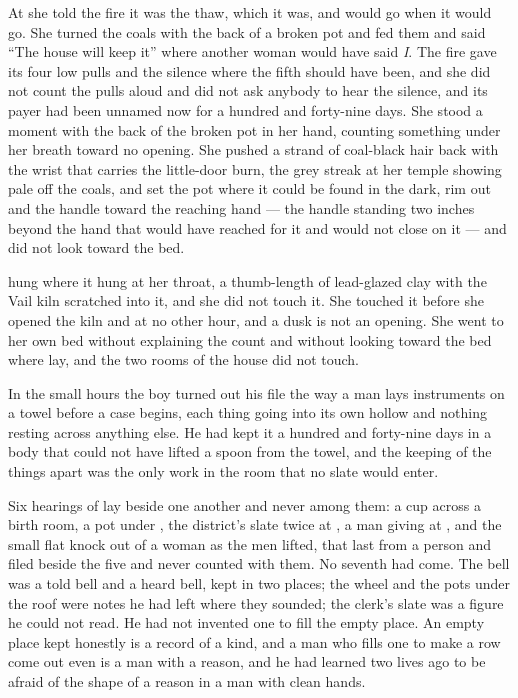 At  she told the fire it was the thaw, which it was, and would go when it would go. She turned the coals with the back of a broken pot and fed them and said “The house will keep it” where another woman would have said \emph{I}. The fire gave its four low pulls and the silence where the fifth should have been, and she did not count the pulls aloud and did not ask anybody to hear the silence, and its payer had been unnamed now for a hundred and forty-nine days. She stood a moment with the back of the broken pot in her hand, counting something under her breath toward no opening. She pushed a strand of coal-black hair back with the wrist that carries the little-door burn, the grey streak at her temple showing pale off the coals, and set the pot where it could be found in the dark, rim out and the handle toward the reaching hand --- the handle standing two inches beyond the hand that would have reached for it and would not close on it --- and did not look toward the bed.

 hung where it hung at her throat, a thumb-length of lead-glazed clay with the Vail kiln scratched into it, and she did not touch it. She touched it before she opened the kiln and at no other hour, and a dusk is not an opening. She went to her own bed without explaining the count and without looking toward the bed where  lay, and the two rooms of the house did not touch.

\scenebreak

In the small hours the boy turned out his file the way a man lays instruments on a towel before a case begins, each thing going into its own hollow and nothing resting across anything else. He had kept it a hundred and forty-nine days in a body that could not have lifted a spoon from the towel, and the keeping of the things apart was the only work in the room that no slate would enter.

Six hearings of  lay beside one another and never among them: a cup across a birth room, a pot under , the district's slate twice at , a man giving at , and the small flat knock out of a woman as the men lifted, that last from a person and filed beside the five and never counted with them. No seventh had come. The bell was a told bell and a heard bell, kept in two places; the wheel and the pots under the roof were notes he had left where they sounded; the clerk's slate was a figure he could not read. He had not invented one to fill the empty place. An empty place kept honestly is a record of a kind, and a man who fills one to make a row come out even is a man with a reason, and he had learned two lives ago to be afraid of the shape of a reason in a man with clean hands.

